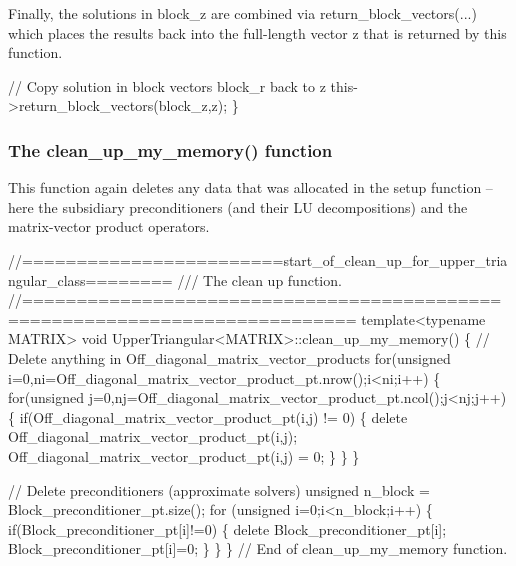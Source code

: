 Finally, the solutions in {\ttfamily block\+\_\+z} are combined via {\ttfamily return\+\_\+block\+\_\+vectors}(...) which places the results back into the full-\/length vector {\ttfamily z} that is returned by this function.


\begin{DoxyCodeInclude}
  \textcolor{comment}{// Copy solution in block vectors block\_r back to z}
  this->return\_block\_vectors(block\_z,z);
 \}

\end{DoxyCodeInclude}
\hypertarget{index_upper_triangular_clean}{}\subsubsection{The clean\+\_\+up\+\_\+my\+\_\+memory() function}\label{index_upper_triangular_clean}
This function again deletes any data that was allocated in the setup function -- here the subsidiary preconditioners (and their LU decompositions) and the matrix-\/vector product operators.


\begin{DoxyCodeInclude}
 \textcolor{comment}{//========================start\_of\_clean\_up\_for\_upper\_triangular\_class========}\textcolor{comment}{}
\textcolor{comment}{ /// The clean up function.}
\textcolor{comment}{} \textcolor{comment}{//============================================================================}
 \textcolor{keyword}{template}<\textcolor{keyword}{typename} MATRIX> 
 \textcolor{keywordtype}{void} UpperTriangular<MATRIX>::clean\_up\_my\_memory()
 \{     
  \textcolor{comment}{// Delete anything in Off\_diagonal\_matrix\_vector\_products}
  \textcolor{keywordflow}{for}(\textcolor{keywordtype}{unsigned} i=0,ni=Off\_diagonal\_matrix\_vector\_product\_pt.nrow();i<ni;i++)
   \{
    \textcolor{keywordflow}{for}(\textcolor{keywordtype}{unsigned} j=0,nj=Off\_diagonal\_matrix\_vector\_product\_pt.ncol();j<nj;j++)
     \{
      \textcolor{keywordflow}{if}(Off\_diagonal\_matrix\_vector\_product\_pt(i,j) != 0)
       \{    
        \textcolor{keyword}{delete} Off\_diagonal\_matrix\_vector\_product\_pt(i,j);
        Off\_diagonal\_matrix\_vector\_product\_pt(i,j) = 0;
       \}
     \}
   \}

  \textcolor{comment}{// Delete preconditioners (approximate solvers)}
  \textcolor{keywordtype}{unsigned} n\_block = Block\_preconditioner\_pt.size();
  \textcolor{keywordflow}{for} (\textcolor{keywordtype}{unsigned} i=0;i<n\_block;i++)
   \{
    \textcolor{keywordflow}{if}(Block\_preconditioner\_pt[i]!=0)
     \{
      \textcolor{keyword}{delete} Block\_preconditioner\_pt[i];
      Block\_preconditioner\_pt[i]=0;
     \}
   \}
 \} \textcolor{comment}{// End of clean\_up\_my\_memory function.}

\end{DoxyCodeInclude}




